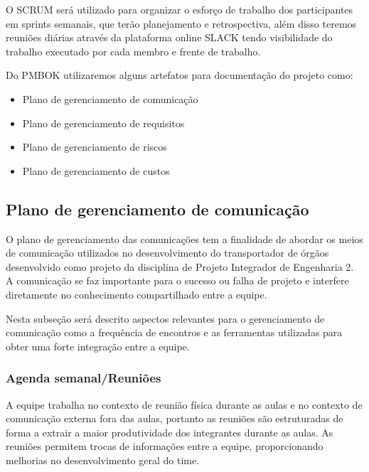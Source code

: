 O SCRUM será utilizado para organizar o esforço de trabalho dos participantes em sprints semanais, que terão planejamento e retrospectiva, além disso teremos reuniões diárias através da plataforma online SLACK tendo visibilidade do trabalho executado por cada membro e frente de trabalho.

Do PMBOK utilizaremos alguns artefatos para documentação do projeto como:

\begin{itemize}
	\item Plano de gerenciamento de comunicação
	\item Plano de gerenciamento de requisitos
    \item Plano de gerenciamento de riscos
    \item Plano de gerenciamento de custos
\end{itemize}

\subsection{Plano de gerenciamento de comunicação}

O plano de gerenciamento das comunicações tem a finalidade de abordar os meios de comunicação utilizados no desenvolvimento do transportador de órgãos desenvolvido como projeto da disciplina de Projeto Integrador de Engenharia 2. A comunicação se faz importante para o sucesso ou falha de projeto e interfere diretamente no conhecimento compartilhado entre a equipe.

Nesta subseção será descrito aspectos relevantes para o gerenciamento de comunicação como a frequência de encontros e as ferramentas utilizadas para obter uma forte integração entre a equipe.

\subsubsection{Agenda semanal/Reuniões}

A equipe trabalha no contexto de reunião física durante as aulas e no contexto de comunicação externa fora das aulas, portanto as reuniões são estruturadas de forma a extrair a maior produtividade dos integrantes durante as aulas.
As reuniões permitem trocas de informações entre a equipe, proporcionando melhorias no desenvolvimento geral do time.

